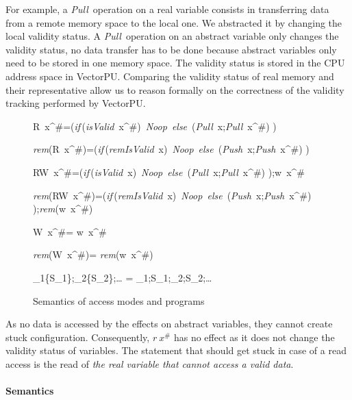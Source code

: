 \documentclass[preprint,12pt]{elsarticle}
\newcommand{\symb}[1]{\textit{#1}}
\newcommand{\noop}{\symb{Noop}}
\newcommand{\Push}{\symb{Push}}
\newcommand{\Pull}{\symb{Pull}}
\newcommand{\isvalid}{\symb{isValid}}
\newcommand{\isremvalid}{\symb{remIsValid}}
\newcommand{\rem}[1]{\symb{rem}(#1)}
\newcommand{\IF}[3]{\symb{if}\,(#1)~#2~\symb{else}~#3 }
\newcommand{\transl}[1]{\llbracket#1\rrbracket}
\newcommand{\abs}[1]{#1^\#}
\newcommand{\AM}{\mathcal{M}}
\begin{document}
For example, a \Pull\ operation on a real variable consists in transferring data from a 
remote memory space 
to the local one. We abstracted it  by changing the local validity status. A \Pull\  
operation on an abstract variable only changes the validity status, no data transfer has 
to be done because abstract variables only need to be stored in one memory space. 
The validity status is stored in the CPU address space in VectorPU. Comparing the validity 
status of real memory and their representative  allow us to reason 
formally on the correctness of the validity tracking performed by VectorPU.

\begin{figure*}[tb]
\begin{mathpar}
\transl{R~\abs x}=(\IF{\isvalid~\abs x}{\noop}{(\Pull~x;\Pull~\abs x)})

\transl{\rem {R~\abs x}}=(\IF{\isremvalid~x}{\noop}{(\Push~x;\Push~\abs x)})

\transl{RW~\abs x}=(\IF{\isvalid~x}{\noop}{(\Pull~x;\Pull~\abs x)});w~\abs x

\transl{\rem{RW~\abs x}}=(\IF{\isremvalid~x}{\noop}{(\Push~x;\Push~\abs x)});\rem{w~\abs 
x}

\transl{W~\abs x}= w~\abs x

\transl{\rem{W~\abs x}}= \rem{w~\abs x}

\transl{\AM_1\{S_1\};\AM_2\{S_2\};\ldots} = \transl{\AM_1};S_1;\transl{\AM_2};S_2;\ldots
\end{mathpar}
\caption{Semantics of access modes and programs}\label{sem-AM}
\end{figure*}
As no data is accessed by the effects on abstract variables, they cannot create stuck configuration. Consequently, $r~\abs x$ has no effect as it does not 
change the validity 
status of variables. The statement that should get stuck in case of a read access is the 
read of \emph{the real variable that cannot access a valid data}. 


\paragraph{Semantics}
\end{document}
